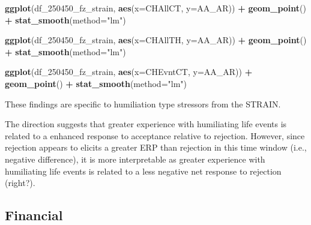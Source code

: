 \documentclass[
]{article}
\newenvironment{Shaded}{\begin{snugshade}}{\end{snugshade}}
\newcommand{\AttributeTok}[1]{\textcolor[rgb]{0.13,0.29,0.53}{#1}}
\newcommand{\FunctionTok}[1]{\textcolor[rgb]{0.13,0.29,0.53}{\textbf{#1}}}
\newcommand{\NormalTok}[1]{#1}
\newcommand{\SpecialCharTok}[1]{\textcolor[rgb]{0.81,0.36,0.00}{\textbf{#1}}}
\newcommand{\StringTok}[1]{\textcolor[rgb]{0.31,0.60,0.02}{#1}}
\begin{document}
\begin{Shaded}
\begin{Highlighting}[]
\FunctionTok{ggplot}\NormalTok{(df\_250450\_fz\_strain, }\FunctionTok{aes}\NormalTok{(}\AttributeTok{x=}\NormalTok{CHAllCT, }\AttributeTok{y=}\NormalTok{AA\_AR)) }\SpecialCharTok{+}
  \FunctionTok{geom\_point}\NormalTok{() }\SpecialCharTok{+}
  \FunctionTok{stat\_smooth}\NormalTok{(}\AttributeTok{method=}\StringTok{"lm"}\NormalTok{)}

\FunctionTok{ggplot}\NormalTok{(df\_250450\_fz\_strain, }\FunctionTok{aes}\NormalTok{(}\AttributeTok{x=}\NormalTok{CHAllTH, }\AttributeTok{y=}\NormalTok{AA\_AR)) }\SpecialCharTok{+}
  \FunctionTok{geom\_point}\NormalTok{() }\SpecialCharTok{+}
  \FunctionTok{stat\_smooth}\NormalTok{(}\AttributeTok{method=}\StringTok{"lm"}\NormalTok{)}
  
\FunctionTok{ggplot}\NormalTok{(df\_250450\_fz\_strain, }\FunctionTok{aes}\NormalTok{(}\AttributeTok{x=}\NormalTok{CHEvntCT, }\AttributeTok{y=}\NormalTok{AA\_AR)) }\SpecialCharTok{+}
  \FunctionTok{geom\_point}\NormalTok{() }\SpecialCharTok{+}
  \FunctionTok{stat\_smooth}\NormalTok{(}\AttributeTok{method=}\StringTok{"lm"}\NormalTok{)}
\end{Highlighting}
\end{Shaded}

These findings are specific to humiliation type stressors from the
STRAIN.

The direction suggests that greater experience with humiliating life
events is related to a enhanced response to acceptance relative to
rejection. However, since rejection appears to elicits a greater ERP
than rejection in this time window (i.e., negative difference), it is
more interpretable as greater experience with humiliating life events is
related to a less negative net response to rejection (right?).

\hypertarget{financial}{%
\subsection{Financial}\label{financial}}
\end{document}
